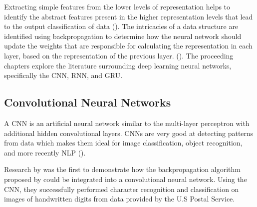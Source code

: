 
Extracting simple features from the lower levels of representation helps to identify the abstract features present in the higher representation levels that lead to the output classification of data (\cite{bengio_deep_2011}).
%
The intricacies of a data structure are identified using backpropagation to determine how the neural network should update the weights that are responsible for calculating the representation in each layer, based on the representation of the previous layer. (\cite{lecun_deep_2015}). The proceeding chapters explore the literature surrounding deep learning neural networks, specifically the \acrfull{CNN}, \acrfull{RNN}, and \acrfull{GRU}.






\subsection{Convolutional Neural Networks}


A \acrfull{CNN} is an artificial neural network similar to the multi-layer perceptron with additional hidden convolutional layers. \acrshort{CNN}s are very good at detecting patterns from data which makes them ideal for image classification, object recognition, and more recently \acrfull{NLP} (\cite{young_cnns_recent_2018}).

Research by \cite{lecun_backprop_cnn_1989} was the first to demonstrate how the backpropagation algorithm proposed by \cite{rumelhart_learning_1986} could be integrated into a convolutional neural network.
Using the \acrshort{CNN}, they successfully performed character recognition and classification on images of handwritten digits from data provided by the U.S Postal Service.

